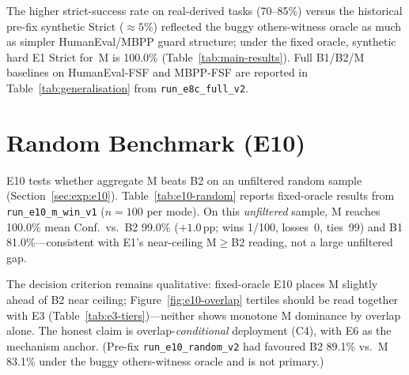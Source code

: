The higher strict-success rate on real-derived tasks (70--85\%) versus the
historical pre-fix synthetic Strict (${\approx}5\%$) reflected the buggy
others-witness oracle as much as simpler HumanEval/MBPP guard structure;
under the fixed oracle, synthetic hard E1 Strict for~M is 100.0\%
(Table~\ref{tab:main-results}).
Full B1/B2/M baselines on HumanEval-FSF and MBPP-FSF are reported in
Table~\ref{tab:generalisation} from \texttt{run\_e8c\_full\_v2}.

\section{Random Benchmark (E10)}
\label{sec:results:e10}

E10 tests whether aggregate M beats B2 on an unfiltered random sample
(Section~\ref{sec:exp:e10}).
Table~\ref{tab:e10-random} reports fixed-oracle results from
\texttt{run\_e10\_m\_win\_v1} ($n{=}100$ per mode).
On this \emph{unfiltered} sample, M reaches 100.0\% mean Conf.\ vs.\ B2
99.0\% (${+}1.0$\,pp; wins 1/100, losses~0, ties~99) and B1 81.0\%---consistent
with E1's near-ceiling M$\ge$B2 reading, not a large unfiltered gap.

\begin{table}[H]
  \caption{Random benchmark results (E10, fixed others-witness oracle).
    Uniformly sampled tasks without Z3 overlap filter; modes B1, B2, M;
    \texttt{run\_e10\_m\_win\_v1}.
    M leads B2 by ${+}1.0$\,pp (1/100 wins).}
  \label{tab:e10-random}
  \centering
\end{table}

The decision criterion remains qualitative: fixed-oracle E10 places M slightly
ahead of B2 near ceiling; Figure~\ref{fig:e10-overlap} tertiles should be read
together with E3 (Table~\ref{tab:e3-tiers})---neither shows monotone M
dominance by overlap alone.
The honest claim is overlap-\emph{conditional} deployment (C4), with E6 as the
mechanism anchor.
(Pre-fix \texttt{run\_e10\_random\_v2} had favoured B2 89.1\% vs.\ M 83.1\%
under the buggy others-witness oracle and is not primary.)

